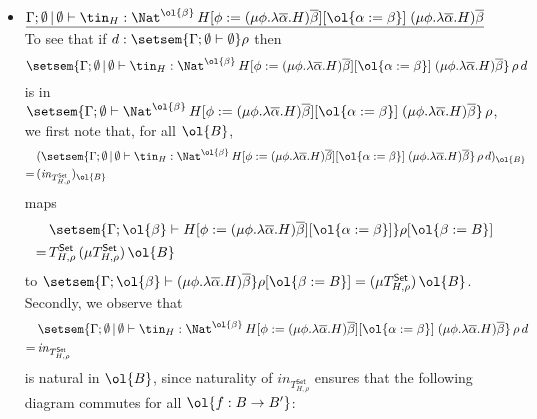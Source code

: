 \documentclass{lmcs}
\theoremstyle{plain}\newtheorem{satz}[thm]{Satz}
\newcommand{\set}{\mathsf{Set}}
\begin{document}
\begin{itemize}
\item
$\underline{\Gamma;\emptyset \,|\, \emptyset \vdash \tin_H :
  \Nat^{\ol{\beta}} \, H[\phi := (\mu \phi.\lambda
    {\overline \alpha}.H){\overline \beta}][\ol{\alpha := \beta}]
  \;(\mu \phi.\lambda {\overline \alpha}.H){\overline \beta}}$\; To
  see that if $d : \setsem{\Gamma;\emptyset \vdash \emptyset} \rho$
  then $$\setsem{\Gamma;\emptyset \,|\, \emptyset \vdash \tin_H :
    \Nat^{\ol{\beta}} \, H[\phi := (\mu \phi.\lambda
      {\overline \alpha}.H){\overline \beta}][\ol{\alpha := \beta}]
    \;(\mu \phi.\lambda {\overline \alpha}.H){\overline \beta}}\,
  \rho\,d$$ 
  is in $\setsem{\Gamma;\emptyset \vdash
    \Nat^{\ol{\beta}} \, H[\phi := (\mu \phi.\lambda
      {\overline \alpha}.H){\overline \beta}][\ol{\alpha := \beta}]
    \;(\mu \phi.\lambda {\overline \alpha}.H){\overline \beta}}\,
  \rho$, we first note that, for all $\ol{B}$,
  \begin{align*}
    &(\setsem{\Gamma;\emptyset \,|\, \emptyset \vdash \tin_H :
    \Nat^{\ol{\beta}} \, H[\phi := (\mu \phi.\lambda
      {\overline \alpha}.H){\overline \beta}][\ol{\alpha := \beta}]
    \;(\mu \phi.\lambda {\overline \alpha}.H){\overline \beta}}\,
  \rho\,d)_{\ol{B}}\, \\
    =\,
    &(\mathit{in}_{T^\set_{H,\rho}})_{\ol{B}}
  \end{align*}
  maps
  \begin{align*}
    &\setsem{\Gamma;\ol{\beta} \vdash H[\phi := (\mu
      \phi.\lambda {\overline \alpha}.H){\overline \beta}][\ol{\alpha
        := \beta}]}\rho[\ol{\beta := B}]  \\ = \,
    &T^\set_{H,\rho}\, (\mu T^\set_{H,\rho}) \, \ol{B}
  \end{align*}
        to $\setsem{\Gamma;\ol{\beta}
    \vdash (\mu \phi.\lambda {\overline \alpha}.H){\overline \beta}}
  \rho[\ol{\beta := B}] = (\mu
  T^\set_{H,\rho}) \, \ol{B}$. 
  Secondly, we observe
  that
  \begin{align*}
    &\setsem{\Gamma;\emptyset \,|\, \emptyset \vdash \tin_H :
    \Nat^{\ol{\beta}} \, H[\phi := (\mu \phi.\lambda
      {\overline \alpha}.H){\overline \beta}][\ol{\alpha := \beta}]
    \;(\mu \phi.\lambda {\overline \alpha}.H){\overline
      \beta}}\,\rho\,d \\ 
      = \, &\mathit{in}_{T^\set_{H,\rho}}
  \end{align*}
  is natural in $\ol{B}$, since naturality of
  $\mathit{in}_{T^\set_{H,\rho}}$
  ensures that the following diagram commutes for all $\ol{f : B \to
    B'}$:


\end{itemize}
\end{document}
